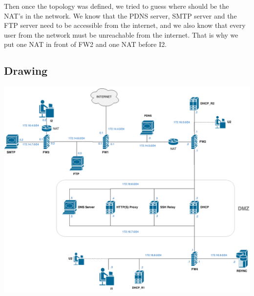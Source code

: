 \documentclass[a4paper,titlepage]{article}
\begin{document}
Then once the topology was defined, we tried to guess where should be the NAT's in the network. We know that the  PDNS server, SMTP server and the FTP server need to be accessible from the internet, and we also know that every user from the network must be unreachable from the internet. That is why we put one NAT in front of FW2 and one NAT before I2.


\subsection{Drawing}
\begin{center}
	\includegraphics[scale=0.4]{ICS-Draw.png}
\end{center}
	
\end{document}
